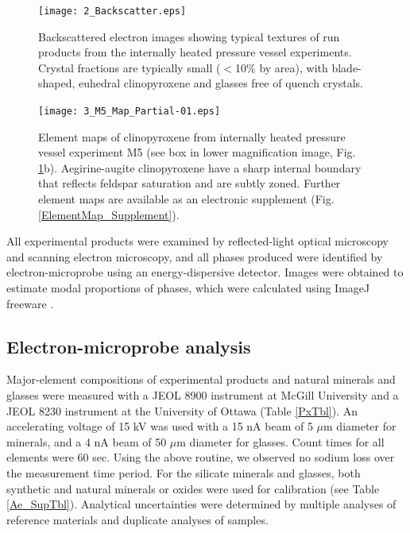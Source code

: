 \documentclass[final,authoryear,3p,times,twocolumn]{elsarticle}
\begin{document}
\begin{figure}[tb]
        \begin{center}
        \texttt{[image: 2\_Backscatter.eps]}
        \caption[Backscattered electron images showing typical textures of run products from the internally heated pressure vessel experiments]{Backscattered electron images showing typical textures of run products from the internally heated pressure vessel experiments. Crystal fractions are typically small ($<$10\% by area), with blade-shaped, euhedral clinopyroxene and glasses free of quench crystals.}
        \label{1_BSE}
        \end{center}
        \end{figure}
        
        
        \begin{figure}[tb]
        \begin{center}
        \texttt{[image: 3\_M5\_Map\_Partial-01.eps]}
        \caption[Element maps of a clinopyroxene from internally heated pressure vessel experiment M5]{Element maps of clinopyroxene from internally heated pressure vessel experiment M5 (see box in lower magnification image, Fig. \ref{1_BSE}b). Aegirine-augite clinopyroxene have a sharp internal boundary that reflects feldspar saturation and are subtly zoned. Further element maps are available as an electronic supplement (Fig. \ref{ElementMap_Supplement}).}
        \label{2_Elementmap}
        \end{center}
        \end{figure}

All experimental products were examined by reflected-light optical microscopy and scanning electron microscopy, and all phases produced were identified by electron-microprobe using an energy-dispersive detector. Images were obtained to estimate modal proportions of phases, which were calculated using ImageJ freeware \citep[][see Table \ref{Ae_SupTbl}]{Rasband2016}.

\subsection{Electron-microprobe analysis}
Major-element compositions of experimental products and natural minerals and glasses were measured with a JEOL 8900 instrument at McGill University and a JEOL 8230 instrument at the University of Ottawa (Table \ref{PxTbl}). An accelerating voltage of 15 kV was used with a 15 nA beam of 5 $\mu$m diameter for minerals, and a 4 nA beam of 50 $\mu$m diameter for glasses. Count times for all elements were 60 sec. Using the above routine, we observed no sodium loss over the measurement time period.
For the silicate minerals and glasses, both synthetic and natural minerals or oxides were used for calibration (see Table \ref{Ae_SupTbl}). Analytical uncertainties were determined by multiple analyses of reference materials and duplicate analyses of samples. 
\end{document}
